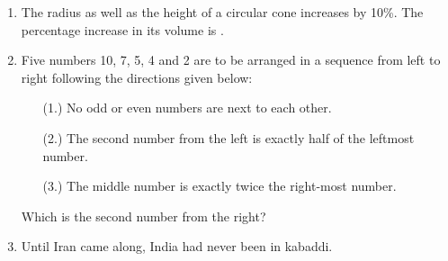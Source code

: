 \documentclass[journal,,12pt,onecolumn]{IEEEtran}
\theoremstyle{remark}
\begin{document}
\begin{enumerate}
\bigskip

\item The radius as well as the height of a circular cone increases by 10\%. The percentage increase in its volume is \underline{\hspace{2cm}}.\\
\begin{enumerate}
\end{enumerate}

\bigskip

\item Five numbers 10, 7, 5, 4 and 2 are to be arranged in a sequence from left to right following the directions given below:\\
\begin{enumerate}
    \item[(1.)] No odd or even numbers are next to each other.
    \item[(2.)] The second number from the left is exactly half of the leftmost number.
    \item[(3.)] The middle number is exactly twice the right-most number.
\end{enumerate}
Which is the second number from the right?\\
\begin{enumerate}
\end{enumerate}

\bigskip

\item Until Iran came along, India had never been \underline{\hspace{2cm}} in kabaddi.\\
\begin{enumerate}
\end{enumerate}


\end{enumerate}
\end{document}
